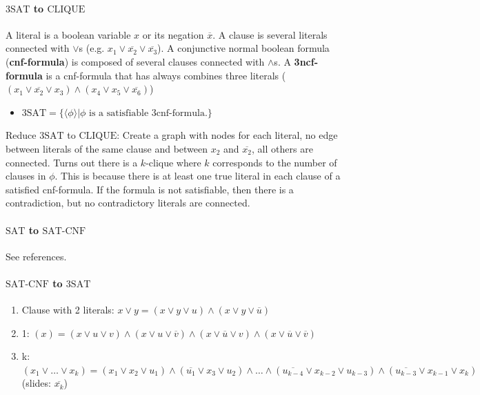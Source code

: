 \documentclass[9pt, twocolumn]{extarticle}
\begin{document}
\paragraph{\texorpdfstring{$\text{3SAT}$ to $\text{CLIQUE}$}{3SAT to CLIQUE}}
A literal is a boolean variable $x$ or its negation $\overline{x}$. A clause is several literals connected with $\lor$s (e.g. $x_1\lor\overline{x_2}\lor\overline{x_3}$). A conjunctive normal boolean formula (\textbf{cnf-formula}) is composed of several clauses connected with $\land$s. A \textbf{3ncf-formula} is a cnf-formula that has always combines three literals ($(x_1\lor\overline{x_2}\lor x_3)\land(x_4\lor x_5\lor\overline{x_6})$)
\begin{itemize}
  \item $\text{3SAT}=\{\langle\phi\rangle|\phi\text{ is a satisfiable 3cnf-formula.}\}$
\end{itemize}
Reduce $\text{3SAT}$ to $\text{CLIQUE}$: Create a graph with nodes for each literal, no edge between literals of the same clause and between $x_2$ and $\overline{x_2}$, all others are connected. Turns out there is a $k$-clique where $k$ corresponds to the number of clauses in $\phi$. This is because there is at least one true literal in each clause of a satisfied cnf-formula. If the formula is not satisfiable, then there is a contradiction, but no contradictory literals are connected.

\paragraph{\texorpdfstring{$\text{SAT}$ to $\text{SAT-CNF}$}{SAT to SAT-CNF}}
See references.

\paragraph{\texorpdfstring{$\text{SAT-CNF}$ to $\text{3SAT}$}{SAT-CNF to 3SAT}}
\begin{enumerate}
  \item Clause with 2 literals: $x\lor y=(x\lor y\lor u)\land(x\lor y\lor\overline{u})$
  \item 1: $(x)=(x\lor u\lor v)\land(x\lor u\lor\overline{v})\land(x\lor\overline{u}\lor v)\land(x\lor\overline{u}\lor\overline{v})$
  \item k: $(x_1\lor\ldots\lor x_k)=(x_1\lor x_2\lor u_1)\land(\overline{u_1}\lor x_3\lor u_2)\land\ldots\land(\overline{u_{k-4}}\lor x_{k-2}\lor u_{k-3})\land(\overline{u_{k-3}}\lor x_{k-1}\lor x_k)$ (slides: $\overline{x_k}$)
\end{enumerate}
\end{document}
